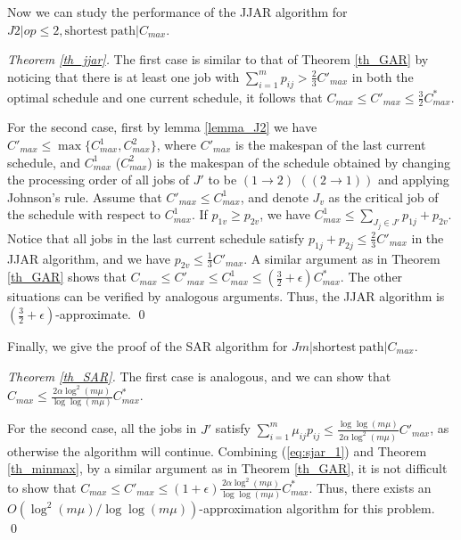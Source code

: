 \documentclass{llncs}
\numberwithin{subcase}{case}
\begin{document}
Now we can study the performance of the JJAR algorithm for $J2|op\leq 2, \mathrm{shortest}~\mathrm{path}|C_{max}$.
\begin{proof}[Theorem \ref{th_jjar}]
The first case is similar to that of Theorem \ref{th_GAR} by noticing that there is at least one job with $\sum_{i=1}^mp_{ij} > \frac{2}{3} C'_{max}$ in both the optimal schedule and one current schedule, it follows that $C_{max}\leq C'_{max} \leq \frac{3}{2}C^*_{max}$.

For the second case, first by lemma \ref{lemma_J2} we have $C'_{max} \leq \max\{C^1_{max}, C^2_{max}\}$, where $C'_{max}$ is the makespan of the last current schedule, and $C^1_{max}$ ($C^2_{max}$) is the makespan of the schedule obtained by changing the processing order of all jobs of $J'$ to be $(1\rightarrow2)$ $((2\rightarrow1))$ and applying Johnson's rule. Assume that $C'_{max} \leq C^1_{max}$, and denote $J_v$ as the critical job of the schedule with respect to $C^1_{max}$. If $p_{1v}\geq p_{2v}$, we have $C^1_{max} \leq \sum_{J_j\in J'} p_{1j} +  p_{2v}$. Notice that all jobs in the last current schedule satisfy $p_{1j} + p_{2j} \leq \frac{2}{3}C'_{max}$ in the JJAR algorithm, and we have $p_{2v} \leq \frac{1}{3}C'_{max}$. A similar argument as in Theorem \ref{th_GAR} shows that $C_{max}\leq C'_{max} \leq C^1_{max} \leq (\frac{3}{2}+\epsilon)C^*_{max}$. The other situations can be verified by analogous arguments. Thus, the JJAR algorithm is $(\frac{3}{2}+\epsilon)$-approximate.
\qed
\end{proof}

Finally, we give the proof of the SAR algorithm for $Jm|\mathrm{shortest}~\mathrm{path}|C_{max}$.
\begin{proof}[Theorem \ref{th_SAR}]
The first case is analogous, and we can show that $C_{max}\leq \frac{2\alpha\log^2(m\mu)}{\log{\log(m\mu)}}C^*_{max}$.

For the second case, all the jobs in $J'$ satisfy $\sum_{i=1}^m\mu_{ij}p_{ij} \leq \frac{\log{\log(m\mu)}}{2\alpha\log^2(m\mu)} C'_{max}$, as otherwise the algorithm will continue. Combining (\ref{eq:sjar_1}) and Theorem \ref{th_minmax}, by a similar argument as in Theorem \ref{th_GAR}, it is not difficult to show that $C_{max} \leq C'_{max} \leq (1+\epsilon)\frac{2\alpha\log^2(m\mu)}{\log{\log(m\mu)}} C^*_{max}$. Thus, there exists an $O(\log^2(m\mu)/\log{\log(m\mu)})$-approximation algorithm for this problem.
\qed
\end{proof}
\end{document}
